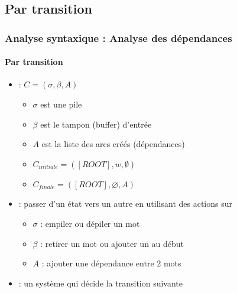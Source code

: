 \documentclass[xcolor=table]{beamer}
\begin{document}
\subsection{Par transition}

\begin{frame}
\frametitle{Analyse syntaxique : Analyse des dépendances}
\framesubtitle{Par transition}

\begin{minipage}{.6\textwidth}
	\begin{itemize}
		\item {} :  $C = (\sigma, \beta, A)$
		\begin{itemize}
			\item $\sigma$ est une pile
			\item $\beta$ est le tampon (buffer) d'entrée
			\item $A$ est la liste des arcs créés (dépendances)
			\item $C_{initiale} = ([ROOT], w, \emptyset)$
			\item $C_{finale} = ([ROOT], \varnothing, A)$
		\end{itemize}
	\end{itemize}
\end{minipage}
\begin{minipage}{.38\textwidth}
\end{minipage}

\begin{itemize}
	\item {} : passer d'un état vers un autre en utilisant des actions sur
	\begin{itemize}
		\item $\sigma$ : empiler ou dépiler un mot
		\item $\beta$ : retirer un mot ou ajouter un au début
		\item $A$ : ajouter une dépendance entre 2 mots
	\end{itemize}
	\item {} : un système qui décide la transition suivante
\end{itemize}

\end{frame}
\end{document}
